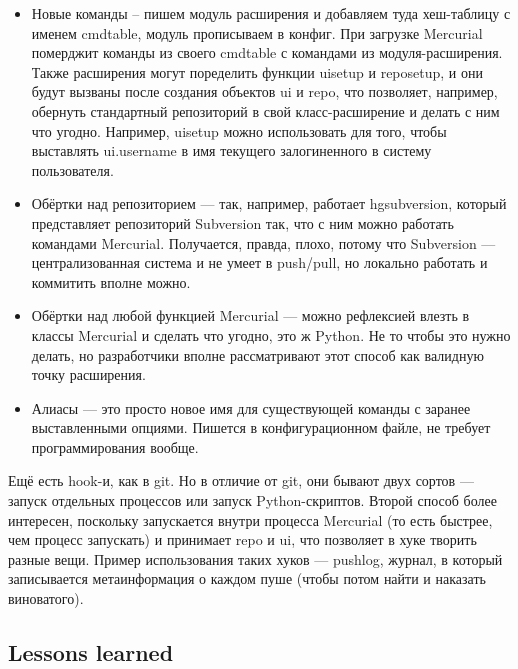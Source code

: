 \documentclass{../../text-style}
\begin{document}
\begin{itemize}
    \item Новые команды -- пишем модуль расширения и добавляем туда хеш-таблицу с именем cmdtable, модуль прописываем в конфиг. При загрузке Mercurial померджит команды из своего cmdtable с командами из модуля-расширения. Также расширения могут поределить функции uisetup и reposetup, и они будут вызваны после создания объектов ui и repo, что позволяет, например, обернуть стандартный репозиторий в свой класс-расширение и делать с ним что угодно. Например, uisetup можно использовать для того, чтобы выставлять ui.username в имя текущего залогиненного в систему пользователя.
    \item Обёртки над репозиторием --- так, например, работает hgsubversion, который представляет репозиторий Subversion так, что с ним можно работать командами Mercurial. Получается, правда, плохо, потому что Subversion --- централизованная система и не умеет в push/pull, но локально работать и коммитить вполне можно.
    \item Обёртки над любой функцией Mercurial --- можно рефлексией влезть в классы Mercurial и сделать что угодно, это ж Python. Не то чтобы это нужно делать, но разработчики вполне рассматривают этот способ как валидную точку расширения.
    \item Алиасы --- это просто новое имя для существующей команды с заранее выставленными опциями. Пишется в конфигурационном файле, не требует программирования вообще.
\end{itemize}

Ещё есть hook-и, как в git. Но в отличие от git, они бывают двух сортов --- запуск отдельных процессов или запуск Python-скриптов. Второй способ более интересен, поскольку запускается внутри процесса Mercurial (то есть быстрее, чем процесс запускать) и принимает repo и ui, что позволяет в хуке творить разные вещи. Пример использования таких хуков --- pushlog, журнал, в который записывается метаинформация о каждом пуше (чтобы потом найти и наказать виноватого).

\subsection{Lessons learned}
\end{document}
